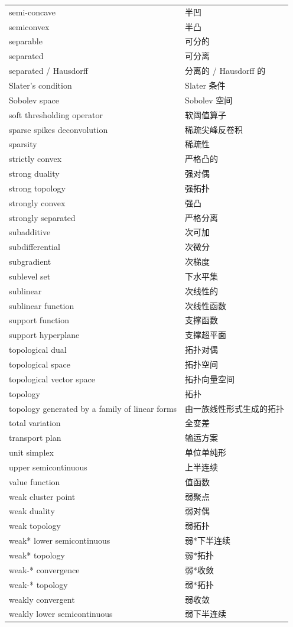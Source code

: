 \begin{longtable}{ll}
semi-concave & 半凹 \\
semiconvex & 半凸 \\
separable & 可分的 \\
separated & 可分离 \\
separated / Hausdorff & 分离的 / Hausdorff 的 \\
Slater's condition & Slater 条件 \\
Sobolev space & Sobolev 空间 \\
soft thresholding operator & 软阈值算子 \\
sparse spikes deconvolution & 稀疏尖峰反卷积 \\
sparsity & 稀疏性 \\
strictly convex & 严格凸的 \\
strong duality & 强对偶 \\
strong topology & 强拓扑 \\
strongly convex & 强凸 \\
strongly separated & 严格分离 \\
subadditive & 次可加 \\
subdifferential & 次微分 \\
subgradient & 次梯度 \\
sublevel set & 下水平集 \\
sublinear & 次线性的 \\
sublinear function & 次线性函数 \\
support function & 支撑函数 \\
support hyperplane & 支撑超平面 \\
topological dual & 拓扑对偶 \\
topological space & 拓扑空间 \\
topological vector space & 拓扑向量空间 \\
topology & 拓扑 \\
topology generated by a family of linear forms & 由一族线性形式生成的拓扑 \\
total variation & 全变差 \\
transport plan & 输运方案 \\
unit simplex & 单位单纯形 \\
upper semicontinuous & 上半连续 \\
value function & 值函数 \\
weak cluster point & 弱聚点 \\
weak duality & 弱对偶 \\
weak topology & 弱拓扑 \\
weak* lower semicontinuous & 弱*下半连续 \\
weak* topology & 弱$*$拓扑 \\
weak-* convergence & 弱*收敛 \\
weak-* topology & 弱$*$拓扑 \\
weakly convergent & 弱收敛 \\
weakly lower semicontinuous & 弱下半连续 \\
\end{longtable}
